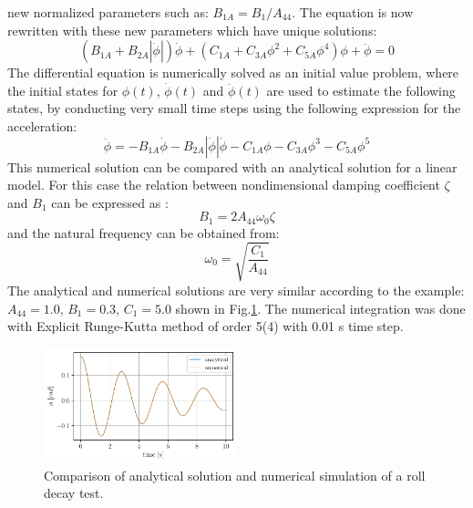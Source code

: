 new normalized parameters such as: $B_{1A} = B_1/A_{44}$. The equation
is now rewritten with these new parameters which have unique solutions:
\begin{equation}
\left(B_{1A} + B_{2A} \left|{\dot{\phi}}\right|\right) \dot{\phi} + \left(C_{1A} + C_{3A} \phi^{2} + C_{5A} \phi^{4}\right) \phi + \ddot{\phi} = 0
\label{eq:roll_decay_equation_quadratic_A}
\end{equation}
The differential equation is numerically solved as an initial value
problem, where the initial states for $\phi(t)$, $\dot{\phi}(t)$ and
$\ddot{\phi}(t)$ are used to estimate the following states, by
conducting very small time steps using the following expression for the
acceleration:
\begin{equation}
\ddot{\phi} = - B_{1A} \dot{\phi} - B_{2A} \left|{\dot{\phi}}\right| \dot{\phi} - C_{1A} \phi - C_{3A} \phi^{3} - C_{5A} \phi^{5}
\label{eq:eq_phi1d}
\end{equation}
This numerical solution can be compared with an analytical solution
\citep{7505983/KL7A3RIV} for a linear model.
For this
case the relation between nondimensional damping coefficient $\zeta$
and $B_1$ can be expressed as \citep{7505983/FB64RGPF}:
\begin{equation}
B_{1} = 2 A_{44} \omega_{0} \zeta
\label{eq:B_1_zeta_eq}
\end{equation}
and the natural frequency can be obtained from:
\begin{equation}
\omega_{0} = \sqrt{\frac{C_{1}}{A_{44}}}
\label{eq:omega0_eq}
\end{equation}
The analytical and numerical solutions are very similar according to the
example: $A_{44} = 1.0$, $B_1 = 0.3$, $C_1 = 5.0$ shown in
Fig.\ref{fig:analytical_numerical}. The numerical integration
was done with Explicit Runge-Kutta method of order 5(4) with 0.01 s time
step.
\begin{figure}[H]
\begin{center}\includegraphics[width = 0.5\textwidth]{figures/analytical_numerical.pdf}\end{center}
\vspace{-1cm}
\caption{Comparison of analytical solution and numerical simulation of a roll decay test.}
\label{fig:analytical_numerical}
\end{figure}
